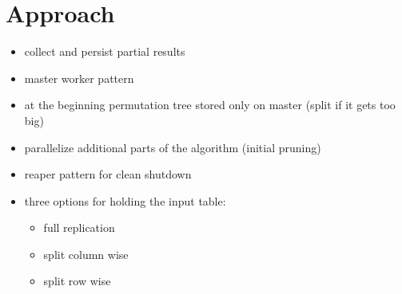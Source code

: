 
\section{Approach}\label{sec:approach}


\begin{itemize}
	\item collect and persist partial results
	\item master worker pattern
	\item at the beginning permutation tree stored only on master (split if it gets too big)
	\item parallelize additional parts of the algorithm (initial pruning)
	\item reaper pattern for clean shutdown
	\item three options for holding the input table:
	\begin{itemize}
		\item full replication
		\item split column wise
		\item split row wise
	\end{itemize}
	
\end{itemize}